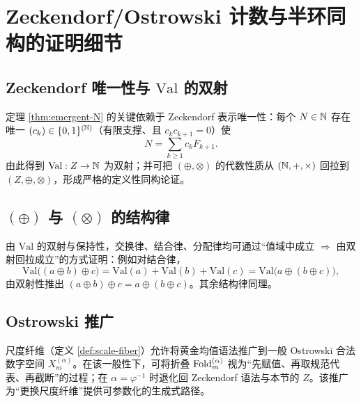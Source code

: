 \section{Zeckendorf/Ostrowski 计数与半环同构的证明细节}\label{app:zeckendorf-ostrowski}

\subsection{Zeckendorf 唯一性与 \texorpdfstring{$\mathrm{Val}$}{Val} 的双射}
定理 \ref{thm:emergent-N} 的关键依赖于 Zeckendorf 表示唯一性：每个 $N\in\mathbb{N}$ 存在唯一 $(c_k)\in\{0,1\}^{(\mathbb{N})}$（有限支撑、且 $c_kc_{k+1}=0$）使
$$
N=\sum_{k\ge 1} c_k F_{k+1}.
$$
由此得到 $\mathrm{Val}:Z\to\mathbb{N}$ 为双射；并可把 $(\oplus,\otimes)$ 的代数性质从 $(\mathbb{N},+,\times)$ 回拉到 $(Z,\oplus,\otimes)$，形成严格的定义性同构论证。

\subsection{\texorpdfstring{$(\oplus)$}{(oplus)} 与 \texorpdfstring{$(\otimes)$}{(otimes)} 的结构律}
由 $\mathrm{Val}$ 的双射与保持性，交换律、结合律、分配律均可通过“值域中成立 $\Rightarrow$ 由双射回拉成立”的方式证明：例如对结合律，
$$
\mathrm{Val}\bigl((a\oplus b)\oplus c\bigr)=\mathrm{Val}(a)+\mathrm{Val}(b)+\mathrm{Val}(c)=\mathrm{Val}\bigl(a\oplus(b\oplus c)\bigr),
$$
由双射性推出 $(a\oplus b)\oplus c=a\oplus(b\oplus c)$。其余结构律同理。

\subsection{Ostrowski 推广}
尺度纤维（定义 \ref{def:scale-fiber}）允许将黄金均值语法推广到一般 Ostrowski 合法数字空间 $X_m^{(\alpha)}$。在该一般性下，可将折叠 $\mathrm{Fold}_m^{(\alpha)}$ 视为“先赋值、再取规范代表、再截断”的过程；在 $\alpha=\varphi^{-1}$ 时退化回 Zeckendorf 语法与本节的 $Z$。该推广为“更换尺度纤维”提供可参数化的生成式路径。

